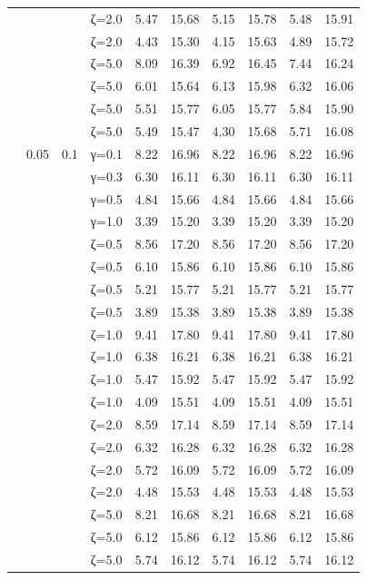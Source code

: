 \begin{table}[htbp]
\begin{tabular}{ll r l  rr  rr  rr}
  &  &  & ζ=2.0 & 5.47 & 15.68 & 5.15 & 15.78 & 5.48 & 15.91 \\
  &  &  & ζ=2.0 & 4.43 & 15.30 & 4.15 & 15.63 & 4.89 & 15.72 \\
  &  &  & ζ=5.0 & 8.09 & 16.39 & 6.92 & 16.45 & 7.44 & 16.24 \\
  &  &  & ζ=5.0 & 6.01 & 15.64 & 6.13 & 15.98 & 6.32 & 16.06 \\
  &  &  & ζ=5.0 & 5.51 & 15.77 & 6.05 & 15.77 & 5.84 & 15.90 \\
  &  &  & ζ=5.0 & 5.49 & 15.47 & 4.30 & 15.68 & 5.71 & 16.08 \\
  & 0.05 & 0.1 & γ=0.1 & 8.22 & 16.96 & 8.22 & 16.96 & 8.22 & 16.96 \\
  &  &  & γ=0.3 & 6.30 & 16.11 & 6.30 & 16.11 & 6.30 & 16.11 \\
  &  &  & γ=0.5 & 4.84 & 15.66 & 4.84 & 15.66 & 4.84 & 15.66 \\
  &  &  & γ=1.0 & 3.39 & 15.20 & 3.39 & 15.20 & 3.39 & 15.20 \\
  &  &  & ζ=0.5 & 8.56 & 17.20 & 8.56 & 17.20 & 8.56 & 17.20 \\
  &  &  & ζ=0.5 & 6.10 & 15.86 & 6.10 & 15.86 & 6.10 & 15.86 \\
  &  &  & ζ=0.5 & 5.21 & 15.77 & 5.21 & 15.77 & 5.21 & 15.77 \\
  &  &  & ζ=0.5 & 3.89 & 15.38 & 3.89 & 15.38 & 3.89 & 15.38 \\
  &  &  & ζ=1.0 & 9.41 & 17.80 & 9.41 & 17.80 & 9.41 & 17.80 \\
  &  &  & ζ=1.0 & 6.38 & 16.21 & 6.38 & 16.21 & 6.38 & 16.21 \\
  &  &  & ζ=1.0 & 5.47 & 15.92 & 5.47 & 15.92 & 5.47 & 15.92 \\
  &  &  & ζ=1.0 & 4.09 & 15.51 & 4.09 & 15.51 & 4.09 & 15.51 \\
  &  &  & ζ=2.0 & 8.59 & 17.14 & 8.59 & 17.14 & 8.59 & 17.14 \\
  &  &  & ζ=2.0 & 6.32 & 16.28 & 6.32 & 16.28 & 6.32 & 16.28 \\
  &  &  & ζ=2.0 & 5.72 & 16.09 & 5.72 & 16.09 & 5.72 & 16.09 \\
  &  &  & ζ=2.0 & 4.48 & 15.53 & 4.48 & 15.53 & 4.48 & 15.53 \\
  &  &  & ζ=5.0 & 8.21 & 16.68 & 8.21 & 16.68 & 8.21 & 16.68 \\
  &  &  & ζ=5.0 & 6.12 & 15.86 & 6.12 & 15.86 & 6.12 & 15.86 \\
  &  &  & ζ=5.0 & 5.74 & 16.12 & 5.74 & 16.12 & 5.74 & 16.12 \\

\end{tabular}
\end{table}
